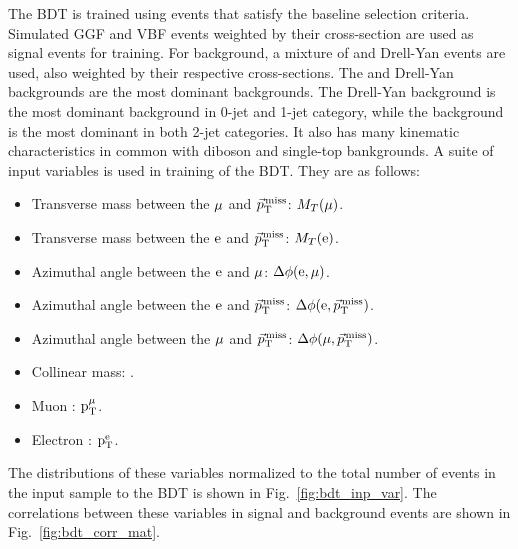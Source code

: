 The BDT is trained using events that satisfy the baseline selection criteria. Simulated GGF and VBF events weighted by their cross-section are used as signal events for training. For background, a mixture of \ttb and Drell-Yan events are used, also weighted by their respective cross-sections. The \ttb and Drell-Yan backgrounds are the most dominant backgrounds. The Drell-Yan background is the most dominant background in 0-jet and 1-jet category, while the \ttb background is the most dominant in both 2-jet categories. It also has many kinematic characteristics in common with diboson and single-top bankgrounds. A suite of input variables is used in training of the BDT. They are as follows:
\begin{itemize}[itemsep=1pt]
\item Transverse mass between the $\mu$ and ${\vec p}_{\mathrm{T}}^{\kern1pt\text{miss}}$: $M_T(\mu)$.
\item Transverse mass between the $\text{e}$ and ${\vec p}_{\mathrm{T}}^{\kern1pt\text{miss}}$: $M_T(\text{e})$. 
\item Azimuthal angle between the $\text{e}$ and $\mu$: $\Delta\phi(\text{e}, \mu)$. 
\item Azimuthal angle between the $\text{e}$ and ${\vec p}_{\mathrm{T}}^{\kern1pt\text{miss}}$: $\Delta\phi(\text{e}, {\vec p}_{\mathrm{T}}^{\kern1pt\text{miss}})$.
\item Azimuthal angle between the $\mu$ and ${\vec p}_{\mathrm{T}}^{\kern1pt\text{miss}}$: $\Delta\phi(\mu, {\vec p}_{\mathrm{T}}^{\kern1pt\text{miss}})$. 
\item Collinear mass: \mcol.
\item Muon \pt: $\text{p}_\text{T}^{\mu}$. 
\item Electron \pt: $\text{p}_\text{T}^{\text{e}}$.
\end{itemize}
The distributions of these variables normalized to the total number of events in the input sample to the BDT is shown in Fig.~\ref{fig:bdt_inp_var}. The correlations between these variables in signal and background events are shown in Fig.~\ref{fig:bdt_corr_mat}.
